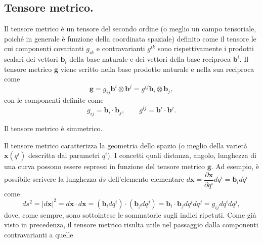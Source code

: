  \subsection{Tensore metrico.}
%
\vspace{15pt}
\begin{definition}
 Il tensore metrico è un tensore del secondo ordine (o meglio un campo tensoriale, poiché in generale è funzione della coordinata spaziale) definito come il tensore le cui componenti covarianti $g_{ik}$ e contravarianti $g^{ik}$ sono rispettivamente i prodotti scalari dei vettori $\bm{b}_i$ della base naturale e dei vettori della base reciproca $\bm{b}^i$. Il tensore metrico $\bm{g}$ viene scritto nella base prodotto naturale e nella sua reciproca come
\begin{equation}
  \bm{g} = g_{ij} \bm{b}^i \otimes \bm{b}^j = g^{ij} \bm{b}_i \otimes \bm{b}_j ,
\end{equation}
con le componenti definite come
 \begin{equation}\label{eqn:defTensoreMetrico}
   g_{ij} = \bm{b}_i \cdot \bm{b}_j , \qquad g^{ij} = \bm{b}^i \cdot \bm{b}^j .
 \end{equation}
\end{definition}
%
\begin{remark}
 Il tensore metrico è simmetrico.
\end{remark}
 Il tensore metrico caratterizza la geometria dello spazio (o meglio della varietà $\bm{x}(q^i)$ descritta dai parametri $q^i$). I concetti quali distanza, angolo, lunghezza di una curva possono essere espressi in funzione del tensore metrico $\bm{g}$. Ad esempio, è possibile scrivere la lunghezza $ds$ dell'elemento elementare $d\bm{x} = \dfrac{\partial \bm{x}}{\partial q^i} dq^i = \bm{b}_i dq^i$ come
 \begin{equation}
  ds^2 = |d\bm{x}|^2 = d\bm{x} \cdot d\bm{x} = \left( \bm{b}_i dq^i \right) \cdot \left(  \bm{b}_j dq^j\right) = \bm{b}_i \cdot \bm{b}_j dq^i dq^j = g_{ij} dq^i dq^j ,
 \end{equation}
 dove, come sempre, sono sottointese le sommatorie sugli indici ripetuti.
%
\noindent
Come già visto in precedenza, il tensore metrico risulta utile nel passaggio dalla componenti contravarianti a quelle 
